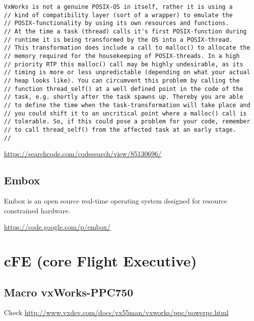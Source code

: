 \begin{verbatim}
VxWorks is not a genuine POSIX-OS in itself, rather it is using a
// kind of compatibility layer (sort of a wrapper) to emulate the
// POSIX-functionality by using its own resources and functions.
// At the time a task (thread) calls it's first POSIX-function during
// runtime it is being transformed by the OS into a POSIX-thread.
// This transformation does include a call to malloc() to allocate the
// memory required for the housekeeping of POSIX-threads. In a high
// priority RTP this malloc() call may be highly undesirable, as its
// timing is more or less unpredictable (depending on what your actual
// heap looks like). You can circumvent this problem by calling the
// function thread_self() at a well defined point in the code of the
// task, e.g. shortly after the task spawns up. Thereby you are able
// to define the time when the task-transformation will take place and
// you could shift it to an uncritical point where a malloc() call is
// tolerable. So, if this could pose a problem for your code, remember
// to call thread_self() from the affected task at an early stage.
//
\end{verbatim}
\url{https://searchcode.com/codesearch/view/85130696/}


\subsection{Embox}

Embox is an open source real-time operating system designed for resource
constrained hardware.

\url{https://code.google.com/p/embox/}



\section{cFE (core Flight Executive)}

\subsection{Macro vxWorks-PPC750}

Check \url{http://www.vxdev.com/docs/vx55man/vxworks/ppc/powerpc.html}

